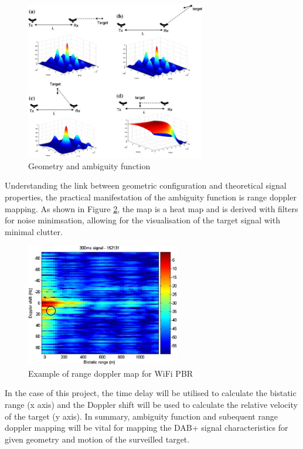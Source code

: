 \documentclass[12pt,a4paper]{article}
\begin{document}
\begin{figure}[htbp]
    \centering
    \includegraphics[width=0.7\textwidth]{ambiguity.jpg}
    \caption{Geometry and ambiguity function \cite{FundamentalsPassiveRadar}}
    \label{fig:ambiguity}
\end{figure}

\par \vspace{0.5cm} 
\noindent Understanding the link between geometric configuration and theoretical signal properties, the practical manifestation of the ambiguity function is range doppler mapping. As shown in Figure \ref{fig:rangeDoppler}, the map is a heat map and is derived with filters for noise minimsation, allowing for the visualisation of the target signal with minimal clutter. 
\begin{figure}[htbp]
    \centering
    \includegraphics[width=0.6\textwidth]{rangeDoppler.jpg}
    \caption{Example of range doppler map for WiFi PBR \cite{FundamentalsPassiveRadar}}
    \label{fig:rangeDoppler}
\end{figure}
\par  
\noindent In the case of this project, the time delay will be utilised to calculate the bistatic range (x axis) and the Doppler shift will be used to calculate the relative velocity of the target (y axis). In summary, ambiguity function and subequent range doppler mapping will be vital for mapping the DAB+ signal characteristics for given geometry and motion of the surveilled target.
\end{document}
